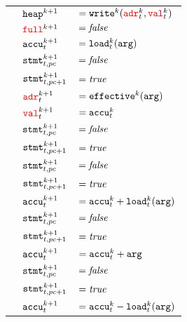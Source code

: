 \begin{longtabu}{llX[m]}
  \firsthline
    & $\texttt{heap}^{k + 1}$   & $= \texttt{write}^k({\color{red}\texttt{adr}}^k_t, {\color{red}\texttt{val}}^k_t)$ \\
    & ${\color{red}\texttt{full}}^{k + 1}$ & $= \textit{false}$ \\
  \hline
    & $\texttt{accu}^{k + 1}_t$           & $= \texttt{load}^k_t(\texttt{arg})$ \\
    & $\texttt{stmt}^{k + 1}_{t, pc}$     & $= \textit{false}$ \\
    & $\texttt{stmt}^{k + 1}_{t, pc + 1}$ & $= \textit{true}$ \\
  \hline
    & ${\color{red}\texttt{adr}}^{k + 1}_t$          & $= \texttt{effective}^k(\texttt{arg})$ \\
    & ${\color{red}\texttt{val}}^{k + 1}_t$          & $= \texttt{accu}^k_t$ \\
    & $\texttt{stmt}^{k + 1}_{t, pc}$     & $= \textit{false}$ \\
    & $\texttt{stmt}^{k + 1}_{t, pc + 1}$ & $= \textit{true}$ \\
  \hline
    & $\texttt{stmt}^{k + 1}_{t, pc}$     & $= \textit{false}$ \\
    & $\texttt{stmt}^{k + 1}_{t, pc + 1}$ & $= \textit{true}$ \\
  \hline
    & $\texttt{accu}^{k + 1}_t$           & $= \texttt{accu}^k_t + \texttt{load}^k_t(\texttt{arg})$ \\
    & $\texttt{stmt}^{k + 1}_{t, pc}$     & $= \textit{false}$ \\
    & $\texttt{stmt}^{k + 1}_{t, pc + 1}$ & $= \textit{true}$ \\
  \hline
    & $\texttt{accu}^{k + 1}_t$           & $= \texttt{accu}^k_t + \texttt{arg}$ \\
    & $\texttt{stmt}^{k + 1}_{t, pc}$     & $= \textit{false}$ \\
    & $\texttt{stmt}^{k + 1}_{t, pc + 1}$ & $= \textit{true}$ \\
  \hline
  \newpage
  \hline
    & $\texttt{accu}^{k + 1}_t$           & $= \texttt{accu}^k_t - \texttt{load}^k_t(\texttt{arg})$ \\

\end{longtabu}
